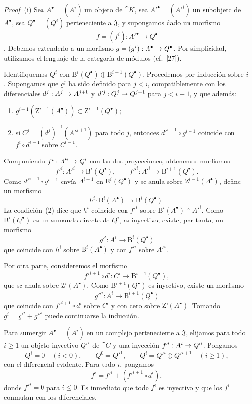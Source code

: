 \documentclass[oneside]{amsart}
\makeatletter
\renewcommand{\leq}{\leqslant}
\renewcommand{\geq}{\geqslant}
\newcommand{\ega@arrow}[2]{\mathchoice{#1}{#2}{#2}{#2}}
\renewcommand{\to}{\ega@arrow{\longrightarrow}{\rightarrow}}
\makeatother
\begin{document}
\begin{proof}
{\rm(i)}
Sea $A^\bullet=(A^i)$ un objeto de $\cat{K}$, sea $A'^\bullet=(A'^i)$ un subobjeto de $A^\bullet$, sea $Q^\bullet=(Q^i)$ perteneciente a $\mathfrak{J}$, y supongamos dado un morfismo
\[
  f=(f^i):A'^\bullet\longrightarrow Q^\bullet
\]
.
Debemos extenderlo a un morfismo $g=(g^i):A^\bullet\to Q^\bullet$.
Por simplicidad, utilizamos el lenguaje de la categoría de módulos (cf.~[27]).

Identifiquemos $Q^i$ con $\mathrm{B}^i(Q^\bullet)\oplus\mathrm{B}^{i+1}(Q^\bullet)$.
Procedemos por inducción sobre $i$.
Supongamos que $g^j$ ha sido definido para $j<i$, compatiblemente con los diferenciales $d^j:A^j\to A^{j+1}$ y $d'^j:Q^j\to Q^{j+1}$ para $j<i-1$, y que además:
\begin{enumerate}
  \item[{\rm(1)}] $g^{i-1}(\mathrm{Z}^{i-1}(A^\bullet))\subset\mathrm{Z}^{i-1}(Q^\bullet)$;
  \item[{\rm(2)}] si $C^j=(d^j)^{-1}(A'^{j+1})$ para todo $j$, entonces $d'^{i-1}\circ g^{i-1}$ coincide con $f^i\circ d^{i-1}$ sobre $C^{i-1}$.
\end{enumerate}
Componiendo $f^i:A'^i\to Q^i$ con las dos proyecciones, obtenemos morfismos
\[
  f'^i:A'^i\longrightarrow\mathrm{B}^i(Q^\bullet),
  \qquad
  f''^i:A'^i\longrightarrow\mathrm{B}^{i+1}(Q^\bullet).
\]
Como $d'^{i-1}\circ g^{i-1}$ envía $A^{i-1}$ en $\mathrm{B}^i(Q^\bullet)$ y se anula sobre $\mathrm{Z}^{i-1}(A^\bullet)$, define un morfismo
\[
  h^i:\mathrm{B}^i(A^\bullet)\longrightarrow\mathrm{B}^i(Q^\bullet).
\]
La condición~{\rm(2)} dice que $h^i$ coincide con $f'^i$ sobre $\mathrm{B}^i(A^\bullet)\cap A'^i$.
Como $\mathrm{B}^i(Q^\bullet)$ es un sumando directo de $Q^i$, es inyectivo; existe, por tanto, un morfismo
\[
  g'^i:A^i\longrightarrow\mathrm{B}^i(Q^\bullet)
\]
que coincide con $h^i$ sobre $\mathrm{B}^i(A^\bullet)$ y con $f'^i$ sobre $A'^i$.

Por otra parte, consideremos el morfismo
\[
  f'^{i+1}\circ d^i:C^i\longrightarrow\mathrm{B}^{i+1}(Q^\bullet),
\]
que se anula sobre $\mathrm{Z}^i(A^\bullet)$.
Como $\mathrm{B}^{i+1}(Q^\bullet)$ es inyectivo, existe un morfismo
\[
  g''^i:A^i\longrightarrow\mathrm{B}^{i+1}(Q^\bullet)
\]
que coincide con $f'^{i+1}\circ d^i$ sobre $C^i$ y con cero sobre $\mathrm{Z}^i(A^\bullet)$.
Tomando $g^i=g'^i+g''^i$ puede continuarse la inducción.

\smallskip
{}
Para sumergir $A^\bullet=(A^i)$ en un complejo perteneciente a $\mathfrak{J}$, elijamos para todo $i\geq1$ un objeto inyectivo $Q'^i$ de $\cat{C}$ y una inyección $f'^i:A^i\to Q'^i$.
Pongamos
\[
  Q^i=0\quad(i<0),\qquad Q^0=Q'^1,\qquad
  Q^i=Q'^i\oplus Q'^{i+1}\quad(i\geq1),
\]
con el diferencial evidente.
Para todo $i$, pongamos
\[
  f^i=f'^i+(f'^{i+1}\circ d^i),
\]
donde $f'^i=0$ para $i\leq0$.
Es inmediato que todo $f^i$ es inyectivo y que los $f^i$ conmutan con los diferenciales.
\end{proof}
\end{document}
